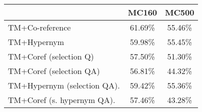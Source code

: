 \begin{tabular}{|l|c|c|}
\hline
 & MC160 & MC500 \\ \hline
TM+Co-reference   & 61.69\%  & 55.46\%  \\ \hline
TM+Hypernym   & 59.98\%  & 55.45\%  \\ \hline
TM+Coref (selection Q)   & 57.50\%  & 51.30\%  \\ \hline
TM+Coref (selection QA)   & 56.81\%  & 44.32\%  \\ \hline
TM+Hypernym (selection QA).   & 59.42\%  & 55.36\%  \\ \hline
TM+Coref (s. hypernym QA).   & 57.46\%  & 43.28\%  \\ \hline
\end{tabular}